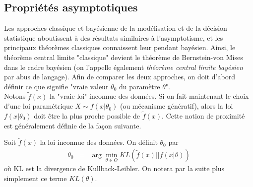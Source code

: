 

\subsection{Propriétés asymptotiques}\label{asymptotique}

Les approches classique et bayésienne de la modélisation et de la décision statistique aboutissent à des résultats similaires à l'asymptotisme, et les principaux théorèmes classiques connaissent leur pendant bayésien. Ainsi, le théorème central limite "classique" devient le théorème de Bernstein-von Mises dans le cadre bayésien (on l'appelle également \emph{théorème central limite bayésien} par abus de langage). Afin de comparer les deux approches, on doit d'abord définir ce que signifie "vraie valeur $\theta_0$ du paramètre $\theta$". \\

Notons $\tilde{f}(x)$ la "vraie loi" inconnue des données.  Si on fait maintenant le choix d'une loi paramétrique $X\sim f(x|\theta_{0})$ (ou mécanisme génératif), alors la loi $f(x|\theta_0)$ doit être la plus proche possible de $\tilde{f}(x)$. Cette notion de proximité est généralement définie de la fa\c con suivante.

\begin{definition}
Soit $\tilde{f}(x)$ la loi inconnue des données. On  définit $\theta_0$ par
\begin{eqnarray*}
\theta_0 & = & \arg\min\limits_{\theta\in\Theta}  KL\left(\tilde{f}(x) || f(x|\theta)\right)
\end{eqnarray*}
où KL est la divergence de Kullback-Leibler. On notera par la suite plus simplement ce terme $KL(\theta)$.
\end{definition}

